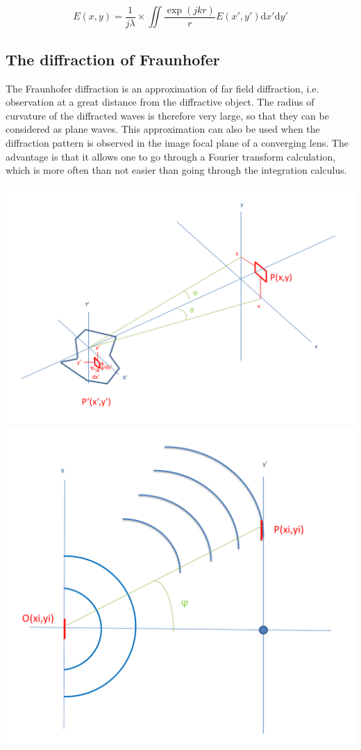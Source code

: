 \documentclass[10pt,a4paper]{article}
\begin{document}
\[
E(x,y)=\frac{1}{j\lambda}
\times \iint \frac{\exp\left(jkr\right)}{r}
E(x',y')\mathrm{d}x'\mathrm{d}y'
\]

	\subsection{The diffraction of Fraunhofer}
The Fraunhofer diffraction is an approximation of far field diffraction, i.e. observation at a great distance from the diffractive object. The radius of curvature of the diffracted waves is therefore very large, so that they can be considered as plane waves. This approximation can also be used when the diffraction pattern is observed in the image focal plane of a converging lens. The advantage is that it allows one to go through a Fourier transform calculation, which is more often than not easier than going through the integration calculus.

\begin{center}
\includegraphics[scale=0.32]{./figures/schema-1-crop.png}
\includegraphics[scale=0.32]{./figures/schema-2-crop.png}
\end{center}
\end{document}
